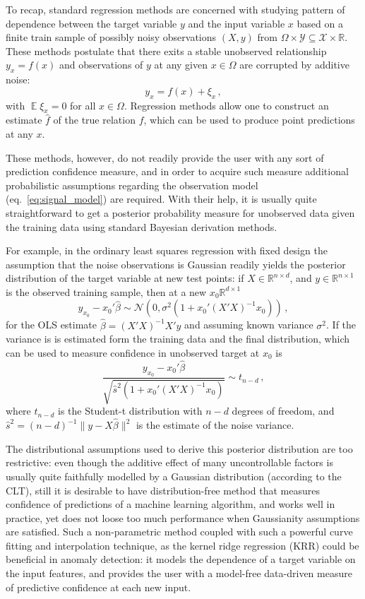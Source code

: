 \documentclass[a4paper,14pt]{extarticle}
\newcommand{\ex}{\mathop{\mathbb{E}}\nolimits}
\newcommand{\Ncal}{\mathcal{N}}
\newcommand{\Xcal}{\mathcal{X}}
\newcommand{\Ycal}{\mathcal{Y}}
\newcommand{\Real}{\mathbb{R}}
\begin{document}
To recap, standard regression methods are concerned with studying pattern of dependence
between the target variable $y$ and the input variable $x$ based on a finite train
sample of  possibly noisy observations $(X, y)$ from $\Omega\times \Ycal \subseteq
\Xcal\times\Real$. These methods postulate that there exits a stable unobserved relationship
$y_x = f(x)$ and observations of $y$ at any given $x\in\Omega$ are corrupted by
additive noise:
\begin{equation} \label{eq:signal_model}
  y_x = f(x) + \xi_x \,,
\end{equation}
with $\ex \xi_x = 0$ for all $x\in \Omega$. Regression methods allow one to construct
an estimate $\hat{f}$ of the true relation $f$, which can be used to produce point
predictions at any $x$.

These methods, however, do not readily provide the user with any sort of prediction
confidence measure, and in order to acquire such measure additional probabilistic
assumptions regarding the observation model (eq.~\ref{eq:signal_model}) are required.
With their help, it is usually quite straightforward to get a posterior probability
measure for unobserved data given the training data using standard Bayesian derivation
methods.

For example, in the ordinary least squares regression with fixed design the assumption
that the noise observations is Gaussian readily yields the posterior distribution of
the target variable at new test points: if $X\in \Real^{n\times d}$, and $y\in\Real^{n\times1}$
is the observed training sample, then at a new $x_0\Real^{d\times 1}$
\begin{equation}
  y_{x_0} - x_0'\hat{\beta} \sim \Ncal(0, \sigma^2(1 + x_0'(X'X)^{-1} x_0)) \,,
\end{equation}
for the OLS estimate $\hat{\beta} = (X'X)^{-1} X'y$ and assuming known variance $\sigma^2$.
If the variance is is estimated form the training data and the final distribution,
which can be used to measure confidence in unobserved target at $x_0$ is
\begin{equation*}
  \frac{y_{x_0} - x_0'\hat{\beta}}{\sqrt{\hat{s}^2 (1 + x_0'(X'X)^{-1} x_0)}}
    \sim t_{n-d} \,,
\end{equation*}
where $t_{n-d}$ is the Student-t distribution with $n-d$ degrees of freedom, and
$\hat{s}^2 = (n-d)^{-1}\|y-X\hat{\beta}\|^2$ is the estimate of the noise variance.

The distributional assumptions used to derive this posterior distribution are too
restrictive: even though the additive effect of many uncontrollable factors is usually
quite faithfully modelled by a Gaussian distribution (according to the CLT), still
it is desirable to have distribution-free method that measures confidence of predictions
of a machine learning algorithm, and works well in practice, yet does not loose too
much performance when Gaussianity assumptions are satisfied. Such a non-parametric
method coupled with such a powerful curve fitting and interpolation technique, as
the kernel ridge regression (KRR) could be beneficial in anomaly detection: it models
the dependence of a target variable on the input features, and provides the user with
a model-free data-driven measure of predictive confidence at each new input.
\end{document}
